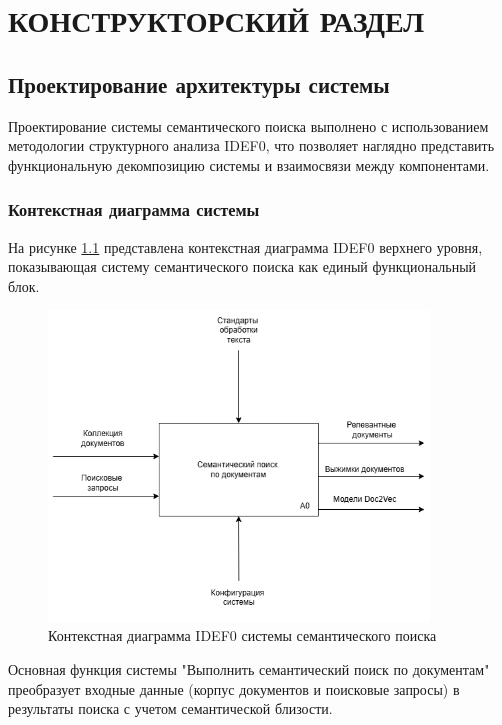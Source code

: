 \chapter{КОНСТРУКТОРСКИЙ РАЗДЕЛ}

\section{Проектирование архитектуры системы}

\justifying

Проектирование системы семантического поиска выполнено с использованием методологии структурного анализа IDEF0, что позволяет наглядно представить функциональную декомпозицию системы и взаимосвязи между компонентами.

\subsection{Контекстная диаграмма системы}

На рисунке \ref{idef0} представлена контекстная диаграмма IDEF0 верхнего уровня, показывающая систему семантического поиска как единый функциональный блок.

\begin{figure}[H]
	\centering
	\includegraphics[width=0.9\textwidth]{images/IDEF0.png}
	\caption{Контекстная диаграмма IDEF0 системы семантического поиска}
	\label{idef0}
\end{figure}

Основная функция системы "Выполнить семантический поиск по документам" преобразует входные данные (корпус документов и поисковые запросы) в результаты поиска с учетом семантической близости. 

